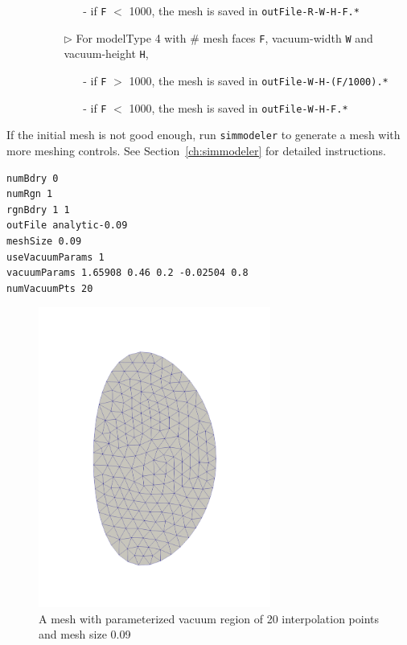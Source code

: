 \begin{itemize}
\begin{itemize}
\begin{itemize}
\begin{itemize}
      \item[-] if \texttt{F} $<$ 1000, the mesh is saved in \texttt{outFile-R-W-H-F.*}
      \end{itemize}
    \item[$\triangleright$] For modelType 4 with \# mesh faces \texttt{F}, vacuum-width \texttt{W} and vacuum-height \texttt{H},
      \begin{itemize}
      \item[-] if \texttt{F} $>$ 1000, the mesh is saved in \texttt{outFile-W-H-(F/1000).*}
      \item[-] if \texttt{F} $<$ 1000, the mesh is saved in \texttt{outFile-W-H-F.*}
      \end{itemize}
    \end{itemize}
  \end{itemize}
\end{itemize}

If the initial mesh is not good enough, run \texttt{simmodeler} to generate a mesh with more meshing controls. See Section~\ref{ch:simmodeler} for detailed instructions.

\begin{verbatim}
numBdry 0
numRgn 1
rgnBdry 1 1
outFile analytic-0.09
meshSize 0.09
useVacuumParams 1
vacuumParams 1.65908 0.46 0.2 -0.02504 0.8
numVacuumPts 20
\end{verbatim}

\begin{figure}
\centering
\includegraphics[width=3in]{./figures/meshgen-analytic-20pts-09.pdf}
\caption[Mesh with parameterized vacuum region I]
{A mesh with parameterized vacuum region of 20 interpolation points and mesh size 0.09}
\label{fig:analytic-mesh-1}
\end{figure}


